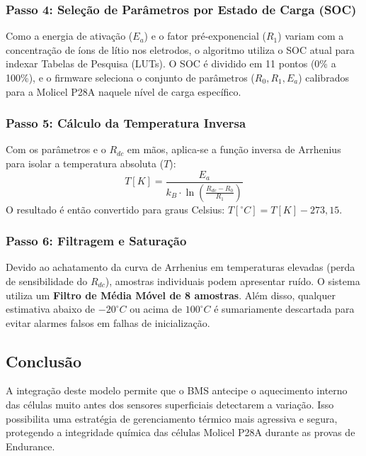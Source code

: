 \subsubsection{Passo 4: Seleção de Parâmetros por Estado de Carga (SOC)}
Como a energia de ativação ($E_a$) e o fator pré-exponencial ($R_1$) variam com a concentração de íons de lítio nos eletrodos, o algoritmo utiliza o SOC atual para indexar Tabelas de Pesquisa (LUTs). O SOC é dividido em 11 pontos (0\% a 100\%), e o firmware seleciona o conjunto de parâmetros ($R_0, R_1, E_a$) calibrados para a Molicel P28A naquele nível de carga específico.

\subsubsection{Passo 5: Cálculo da Temperatura Inversa}
Com os parâmetros e o $R_{dc}$ em mãos, aplica-se a função inversa de Arrhenius para isolar a temperatura absoluta ($T$):
\begin{equation}
T [K] = \frac{E_a}{k_B \cdot \ln\left(\frac{R_{dc} - R_0}{R_1}\right)}
\end{equation}
O resultado é então convertido para graus Celsius: $T [^{\circ}C] = T [K] - 273,15$.

\subsubsection{Passo 6: Filtragem e Saturação}
Devido ao achatamento da curva de Arrhenius em temperaturas elevadas (perda de sensibilidade do $R_{dc}$), amostras individuais podem apresentar ruído. O sistema utiliza um \textbf{Filtro de Média Móvel de 8 amostras}. Além disso, qualquer estimativa abaixo de $-20^{\circ}C$ ou acima de $100^{\circ}C$ é sumariamente descartada para evitar alarmes falsos em falhas de inicialização.

\subsection{Conclusão}
A integração deste modelo permite que o BMS antecipe o aquecimento interno das células muito antes dos sensores superficiais detectarem a variação. Isso possibilita uma estratégia de gerenciamento térmico mais agressiva e segura, protegendo a integridade química das células Molicel P28A durante as provas de Endurance.

